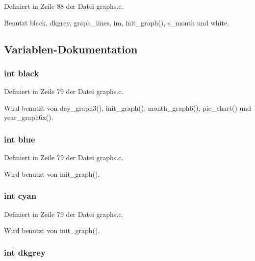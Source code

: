 Definiert in Zeile 88 der Datei graphs.c.

Benutzt black, dkgrey, graph\_\-lines, im, init\_\-graph(), s\_\-month und white.

\subsection{Variablen-Dokumentation}
\subsubsection{\setlength{\rightskip}{0pt plus 5cm}int {\bf black}}\label{graphs_8c_8784d4f8ed73cff78355d2ed8e0c3a3b}




Definiert in Zeile 79 der Datei graphs.c.

Wird benutzt von day\_\-graph3(), init\_\-graph(), month\_\-graph6(), pie\_\-chart() und year\_\-graph6x().
\subsubsection{\setlength{\rightskip}{0pt plus 5cm}int {\bf blue}}\label{graphs_8c_16043f28bf0a6b55db852853f0683fc2}




Definiert in Zeile 79 der Datei graphs.c.

Wird benutzt von init\_\-graph().
\subsubsection{\setlength{\rightskip}{0pt plus 5cm}int {\bf cyan}}\label{graphs_8c_f6bc84de5c6f5361f222772133cf1ab8}




Definiert in Zeile 79 der Datei graphs.c.

Wird benutzt von init\_\-graph().
\subsubsection{\setlength{\rightskip}{0pt plus 5cm}int {\bf dkgrey}}\label{graphs_8c_ee1005868568d9750214235693ba63e1}




